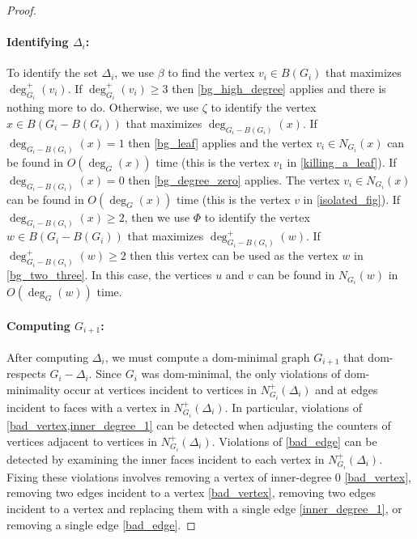 \documentclass{article}
\newcommand{\pat}[1]{\textcolor{red}{PM: #1}}
\newcommand{\hussein}[1]{\textcolor{purple}{HH: #1}}
\theoremstyle{definition}
\begin{document}
\begin{proof}
    \paragraph{Identifying $\Delta_i$:}
    To identify the set $\Delta_i$, we use $\beta$ to find the vertex $v_i\in B(G_i)$ that maximizes $\deg^+_{G_i}(v_i)$.  If $\deg^+_{G_i}(v_i)\ge 3$ then \cref{bg_high_degree} applies and there is nothing more to do.   Otherwise, we use $\zeta$ to identify the vertex $x\in B(G_i-B(G_i))$ that maximizes $\deg_{G_i-B(G_i)}(x)$.  If $\deg_{G_i-B(G_i)}(x)=1$ then \cref{bg_leaf} applies and the vertex $v_i\in N_{G_i}(x)$ can be found in $O(\deg_G(x))$ time (this is the vertex $v_1$ in \cref{killing_a_leaf}).  If $\deg_{G_i-B(G_i)}(x)=0$ then \cref{bg_degree_zero} applies.  The vertex $v_i\in N_{G_i}(x)$ can be found in $O(\deg_G(x))$ time (this is the vertex $v$ in \cref{isolated_fig}).  If $\deg_{G_i-B(G_i)}(x)\ge 2$, then we use $\Phi$ to identify the vertex $w\in B(G_i-B(G_i))$ that maximizes $\deg^+_{G_i-B(G_i)}(w)$.  If  $\deg^+_{G_i-B(G_i)}(w)\ge 2$ then this vertex can be used as the vertex $w$ in \cref{bg_two_three}.  In this case, the vertices $u$ and $v$ can be found in $N_{G_i}(w)$ in $O(\deg_G(w))$ time.

\paragraph{Computing $G_{i+1}$:}  After computing $\Delta_i$, we must compute a dom-minimal graph $G_{i+1}$ that dom-respects $G_i-\Delta_i$.  Since $G_i$ was dom-minimal, the only violations of dom-minimality occur at vertices incident to vertices in $N^+_{G_i}(\Delta_i)$ and at edges incident to faces with a vertex in $N^+_{G_i}(\Delta_i)$.  In particular, violations of \cref{bad_vertex,inner_degree_1} can be detected when adjusting the counters of vertices adjacent to vertices in $N^+_{G_i}(\Delta_i)$.  Violations of \cref{bad_edge} can be detected by examining the inner faces incident to each vertex in $N^+_{G_i}(\Delta_i)$.  Fixing these violations involves removing a vertex of inner-degree $0$ \cref{bad_vertex}, removing two edges incident to a vertex \cref{bad_vertex}, removing two edges incident to a vertex and replacing them with a single edge \cref{inner_degree_1}, or removing a single edge \cref{bad_edge}.



\end{proof}
\end{document}
